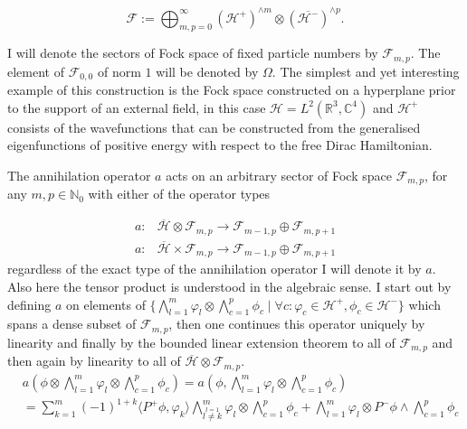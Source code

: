 \documentclass[b5paper,draft,openbib,12pt]{memoir}
\begin{document}
\begin{equation}
\mathcal{F}:=\bigoplus_{m,p=0}^\infty \left(\mathcal{H}^+ \right)^{\wedge m} \otimes \left(\overline{\mathcal{H}^- }\right)^{\wedge p}.
\end{equation}

I will denote the sectors of Fock space of fixed particle
numbers by \(\mathcal{F}_{m,p}\). The element of
\(\mathcal{F}_{0,0}\) of norm \(1\) will be denoted by \(\Omega\).
The simplest and yet interesting example of this construction is
the Fock space constructed on a hyperplane prior to the support of an external field,
in this case \(\mathcal{H}=L^2(\mathbb{R}^3,\mathbb{C}^4)\) and \(\mathcal{H}^+\)
consists of the wavefunctions that can be constructed from the generalised eigenfunctions
of positive energy with respect to the free Dirac Hamiltonian.

The
annihilation operator \(a\) acts on an arbitrary sector of Fock space
\(\mathcal{F}_{m,p}\), for any \(m,p\in\mathbb{N}_0\) with either of the operator types


\begin{align}
a: &\overline{\mathcal{H}}\otimes \mathcal{F}_{m,p} \rightarrow \mathcal{F}_{m-1,p}\oplus \mathcal{F}_{m,p+1}\\
a: &\overline{\mathcal{H}}\times \mathcal{F}_{m,p} \rightarrow \mathcal{F}_{m-1,p}\oplus \mathcal{F}_{m,p+1}
\end{align}
regardless of the exact type of the annihilation operator I will denote it by \(a\). Also here the tensor product is 
understood in the algebraic sense.
I start out by defining \(a\) on elements of 
\(\{\bigwedge_{l=1}^m \varphi_l \otimes \bigwedge_{c=1}^p \phi_c  \mid \forall c:  \varphi_c \in \mathcal{H}^+, \phi_c \in \mathcal{H}^-   \}\)
which spans a dense subset of \(\mathcal{F}_{m,p}\), then one continues this operator uniquely by 
linearity and finally by the bounded linear extension theorem to all of \(\mathcal{F}_{m,p}\) and then 
again by linearity to all of \(\overline{\mathcal{H}}\otimes \mathcal{F}_{m,p}\).
\begin{align}
&a\left(\phi \otimes \bigwedge_{l=1}^m \varphi_l \otimes \bigwedge_{c=1}^p \phi_c\right)=a\left(\phi,\bigwedge_{l=1}^m \varphi_l \otimes \bigwedge_{c=1}^p \phi_c\right)\\
&= \sum_{k=1}^m (-1)^{1+k} \langle P^+ \phi, \varphi_k\rangle \bigwedge_{\overset{l=1}{l\neq k}}^m \varphi_l \otimes \bigwedge_{c=1}^p \phi_c + \bigwedge_{l=1}^m \varphi_l \otimes P^- \phi \wedge \bigwedge_{c=1}^p \phi_c
\end{align}
\end{document}
